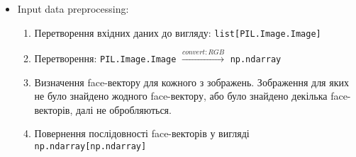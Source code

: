 \documentclass[11pt]{article}
\providecommand{\tightlist}{%
      \setlength{\itemsep}{0pt}\setlength{\parskip}{0pt}}
\begin{document}
\begin{itemize}
\tightlist
\item
  Input data preprocessing:

  \begin{enumerate}
  \def\labelenumi{\arabic{enumi}.}
  \tightlist
  \item
    Перетворення вхідних даних до вигляду:
    \texttt{list{[}PIL.Image.Image{]}}
  \item
    Перетворення: \texttt{PIL.Image.Image}
    \(\overset{convert: RGB}{\longrightarrow}\) \texttt{np.ndarray}
  \item
    Визначення face-вектору для кожного з зображень. Зображення для яких
    не було знайдено жодного face-вектору, або було знайдено декілька
    face-векторів, далі не обробляються.
  \item
    Повернення послідовності face-векторів у вигляді
    \texttt{np.ndarray{[}np.ndarray{]}}
  \end{enumerate}
\end{itemize}
\end{document}
